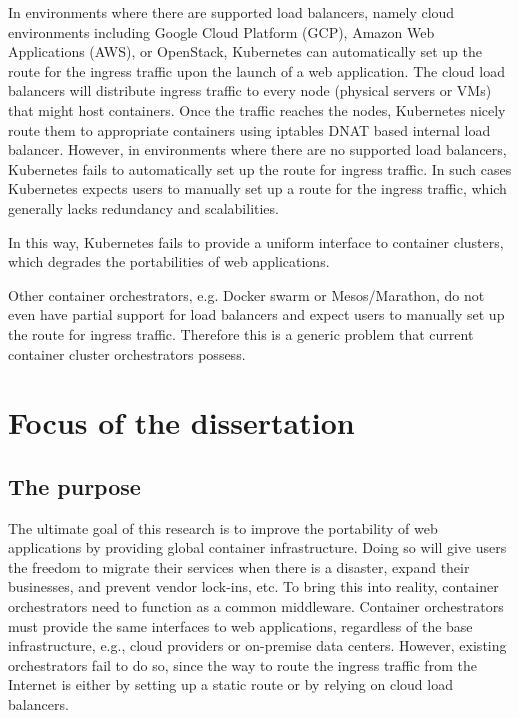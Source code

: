 In environments where there are supported load balancers, namely cloud environments including Google Cloud Platform (GCP), Amazon Web Applications (AWS), or OpenStack, Kubernetes can automatically set up the route for the ingress traffic upon the launch of a web application.
The cloud load balancers will distribute ingress traffic to every node (physical servers or VMs) that might host containers.
Once the traffic reaches the nodes, Kubernetes nicely route them to appropriate containers using iptables DNAT based internal load balancer.
%
However, in environments where there are no supported load balancers, Kubernetes fails to automatically set up the route for ingress traffic.
In such cases Kubernetes expects users to manually set up a route for the ingress traffic, which generally lacks redundancy and scalabilities.

In this way, Kubernetes fails to provide a uniform interface to container clusters, which degrades the portabilities of web applications.

Other container orchestrators, e.g. Docker swarm or Mesos/Marathon, do not even have partial support for load balancers and expect users to manually set up the route for ingress traffic.
Therefore this is a generic problem that current container cluster orchestrators possess.

\section{Focus of the dissertation}

\subsection{The purpose}


  The ultimate goal of this research is to improve the portability of web applications by providing global container infrastructure.
  Doing so will give users the freedom to migrate their services when there is a disaster, expand their businesses, and prevent vendor lock-ins, etc.
  To bring this into reality, container orchestrators need to function as a common middleware. Container orchestrators must provide the same interfaces to web applications, regardless of the base infrastructure, e.g., cloud providers or on-premise data centers.
  However, existing orchestrators fail to do so, since the way to route the ingress traffic from the Internet is either by setting up a static route or by relying on cloud load balancers.




